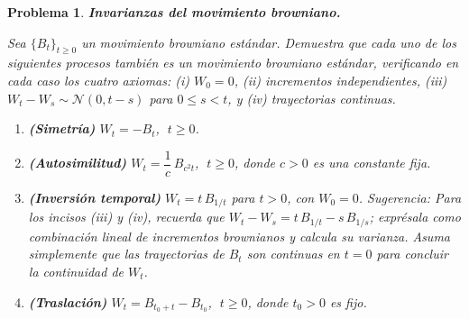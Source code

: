 \documentclass[12pt]{article}
\newtheorem{problem}{Problema}
\begin{document}
%
%

\begin{problem}
\textbf{Invarianzas del movimiento browniano.}

Sea $\{B_t\}_{t \ge 0}$ un movimiento browniano estándar. Demuestra que cada uno de los siguientes procesos también es un movimiento browniano estándar, verificando en cada caso los cuatro axiomas: (i) $W_0 = 0$, (ii) incrementos independientes, (iii) $W_t - W_s \sim \mathcal{N}(0, t-s)$ para $0 \le s < t$, y (iv) trayectorias continuas.

\begin{enumerate}
    \item[(a)] \textbf{(Simetría)} $W_t = -B_t$, $\;t \ge 0$.

    \item[(b)] \textbf{(Autosimilitud)} $W_t = \dfrac{1}{c}\,B_{c^2 t}$, $\;t \ge 0$, donde $c > 0$ es una constante fija.

    \item[(c)] \textbf{(Inversión temporal)} $W_t = t\,B_{1/t}$ para $t > 0$, con $W_0 = 0$. \textit{Sugerencia:} Para los incisos (iii) y (iv), recuerda que $W_t - W_s = t\,B_{1/t} - s\,B_{1/s}$; exprésala como combinación lineal de incrementos brownianos y calcula su varianza. Asuma simplemente que las trayectorias de $B_t$ son continuas en $t = 0$ para concluir la continuidad de $W_t$.

    \item[(d)] \textbf{(Traslación)} $W_t = B_{t_0 + t} - B_{t_0}$, $\;t \ge 0$, donde $t_0 > 0$ es fijo.
\end{enumerate}
\end{problem}

\end{document}
